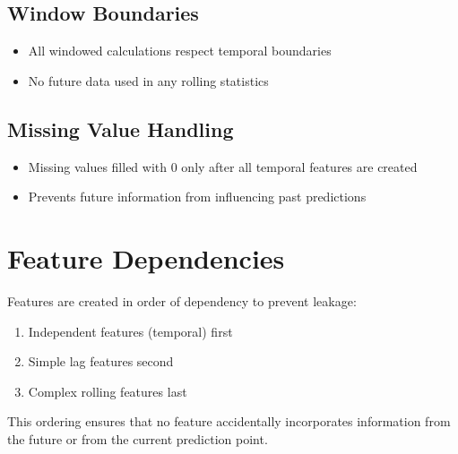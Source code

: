 \documentclass{article}
\begin{document}
\subsection{Window Boundaries}
\begin{itemize}[noitemsep]
\item All windowed calculations respect temporal boundaries
\item No future data used in any rolling statistics
\end{itemize}

\subsection{Missing Value Handling}
\begin{itemize}[noitemsep]
\item Missing values filled with 0 only after all temporal features are created
\item Prevents future information from influencing past predictions
\end{itemize}

\section{Feature Dependencies}

Features are created in order of dependency to prevent leakage:
\begin{enumerate}[noitemsep]
\item Independent features (temporal) first
\item Simple lag features second
\item Complex rolling features last
\end{enumerate}

This ordering ensures that no feature accidentally incorporates information from the future or from the current prediction point.
\end{document}
